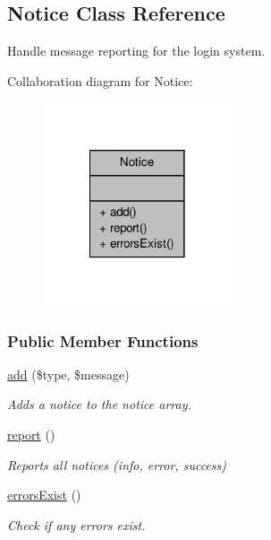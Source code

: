 \hypertarget{classNotice}{\subsection{Notice Class Reference}
\label{classNotice}
}


Handle message reporting for the login system.  




Collaboration diagram for Notice\-:\nopagebreak
\begin{figure}[H]
\begin{center}
\leavevmode
\includegraphics[width=158pt]{classNotice__coll__graph}
\end{center}
\end{figure}
\subsubsection*{Public Member Functions}
\begin{DoxyCompactItemize}
\item 
\hyperlink{classNotice_a8feb95600521cd842ef89bfe5978beb3}{add} (\$type, \$message)
\begin{DoxyCompactList}\small\item\em Adds a notice to the notice array. \end{DoxyCompactList}\item 
\hypertarget{classNotice_a238f96bf3cf9846645659302671e57e2}{\hyperlink{classNotice_a238f96bf3cf9846645659302671e57e2}{report} ()}\label{classNotice_a238f96bf3cf9846645659302671e57e2}

\begin{DoxyCompactList}\small\item\em Reports all notices (info, error, success) \end{DoxyCompactList}\item 
\hyperlink{classNotice_a19a6cbb1ea7b08c42b98d739acaef480}{errors\-Exist} ()
\begin{DoxyCompactList}\small\item\em Check if any errors exist. \end{DoxyCompactList}\end{DoxyCompactItemize}


